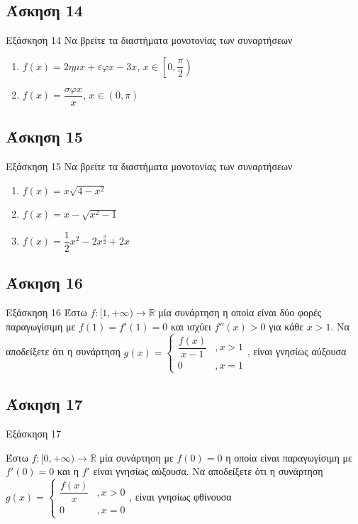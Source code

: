 \documentclass[greek]{beamer}
\begin{document}
\subsection{Άσκηση 14}
\begin{frame}[label=Άσκηση14]{Εξάσκηση 14}
  Να βρείτε τα διαστήματα μονοτονίας των συναρτήσεων
  \begin{enumerate}
    \item<1-> $f(x)=2ημx+εφx-3x$, $x\in \left[ 0,\dfrac{\pi}{2} \right) $
    \item<2-> $f(x)=\dfrac{σφx}{x}$, $x\in (0,\pi) $
  \end{enumerate}

\end{frame}

\subsection{Άσκηση 15}
\begin{frame}[label=Άσκηση15]{Εξάσκηση 15}
  Να βρείτε τα διαστήματα μονοτονίας των συναρτήσεων
  \begin{enumerate}
    \item<1-> $f(x)=x\sqrt{4-x^2}$
    \item<2-> $f(x)=x-\sqrt{x^2-1}$
    \item<3-> $f(x)=\dfrac{1}{2}x^2-2x^{\frac{3}{2}}+2x$
  \end{enumerate}

\end{frame}

\subsection{Άσκηση 16}
\begin{frame}[label=Άσκηση16]{Εξάσκηση 16}
  Έστω $f:[1,+\infty)\to\mathbb{R}$ μία συνάρτηση η οποία είναι δύο φορές παραγωγίσιμη με $f(1)=f'(1)=0$ και ισχύει $f''(x)>0$ για κάθε $x>1$. Να αποδείξετε ότι η συνάρτηση $g(x)=\begin{cases}
    \dfrac{f(x)}{x-1} &,x>1 \\
    0 &,x=1
  \end{cases}$, είναι γνησίως αύξουσα

\end{frame}

\subsection{Άσκηση 17}
\begin{frame}[label=Άσκηση17]{Εξάσκηση 17}

  Έστω $f:[0,+\infty)\to\mathbb{R}$ μία συνάρτηση με $f(0)=0$ η οποία είναι παραγωγίσιμη με $f'(0)=0$ και η $f'$ είναι γνησίως αύξουσα. Να αποδείξετε ότι η συνάρτηση $g(x)=\begin{cases}
    \dfrac{f(x)}{x} &,x>0 \\
    0 &,x=0
  \end{cases}$, είναι γνησίως φθίνουσα

\end{frame}
\end{document}
